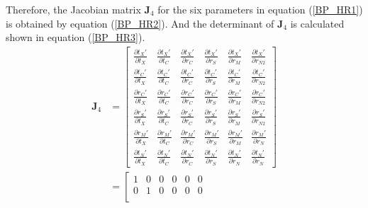 \documentclass{bmcart}
\begin{document}
\begin{backmatter}
Therefore, the Jacobian matrix ${{\mathbf{J}}_4}$ for the six parameters in equation (\ref{BP_HR1}) is obtained by equation (\ref{BP_HR2}). And the determinant of ${{\mathbf{J}}_4}$ is calculated shown in equation (\ref{BP_HR3}).
\begin{equation}\label{BP_HR2}
\begin{aligned}
{{\mathbf{J}}_4} &= \left[ {\begin{array}{*{20}{c}}
  {\frac{{\partial {t_X}'}}{{\partial {t_X}}}}&{\frac{{\partial {t_X}'}}{{\partial {t_C}}}}&{\frac{{\partial {t_X}'}}{{\partial {r_C}}}}&{\frac{{\partial {t_X}'}}{{\partial {r_S}}}}&{\frac{{\partial {t_X}'}}{{\partial {r_{M}}}}}&{\frac{{\partial {t_X}'}}{{\partial {r_{N2}}}}} \\
  {\frac{{\partial {t_C}'}}{{\partial {t_X}}}}&{\frac{{\partial {t_C}'}}{{\partial {t_C}}}}&{\frac{{\partial {t_C}'}}{{\partial {r_C}}}}&{\frac{{\partial {t_C}'}}{{\partial {r_S}}}}&{\frac{{\partial {t_C}'}}{{\partial {r_{M}}}}}&{\frac{{\partial {t_C}'}}{{\partial {r_{N2}}}}} \\
  {\frac{{\partial {r_C}'}}{{\partial {t_X}}}}&{\frac{{\partial {r_C}'}}{{\partial {t_C}}}}&{\frac{{\partial {r_C}'}}{{\partial {r_C}}}}&{\frac{{\partial {r_C}'}}{{\partial {r_S}}}}&{\frac{{\partial {r_C}'}}{{\partial {r_{M}}}}}&{\frac{{\partial {r_C}'}}{{\partial {r_{N2}}}}} \\
  {\frac{{\partial {r_S}'}}{{\partial {t_X}}}}&{\frac{{\partial {r_S}'}}{{\partial {t_C}}}}&{\frac{{\partial {r_S}'}}{{\partial {r_C}}}}&{\frac{{\partial {r_S}'}}{{\partial {r_S}}}}&{\frac{{\partial {r_S}'}}{{\partial {r_{M}}}}}&{\frac{{\partial {r_S}'}}{{\partial {r_{N2}}}}} \\
  {\frac{{\partial {r_{M}}'}}{{\partial {t_X}}}}&{\frac{{\partial {r_{M}}'}}{{\partial {t_C}}}}&{\frac{{\partial {r_{M}}'}}{{\partial {r_C}}}}&{\frac{{\partial {r_{M}}'}}{{\partial {r_S}}}}&{\frac{{\partial {r_{M}}'}}{{\partial {r_{M}}}}}&{\frac{{\partial {r_{M}}'}}{{\partial {r_{N}}}}} \\
  {\frac{{\partial {t_{N}}'}}{{\partial {t_X}}}}&{\frac{{\partial {t_{N}}'}}{{\partial {t_C}}}}&{\frac{{\partial {t_{N}}'}}{{\partial {r_C}}}}&{\frac{{\partial {t_{N}}'}}{{\partial {r_S}}}}&{\frac{{\partial {t_{N}}'}}{{\partial {r_{N}}}}}&{\frac{{\partial {t_{N}}'}}{{\partial {r_{N}}}}}
\end{array}} \right] \\&= \left[ {\begin{array}{*{20}{c}}
  1&0&0&0&0&0 \\
  0&1&0&0&0&0 \\

\end{array}}
\end{aligned}
\end{equation}
\end{backmatter}
\end{document}
